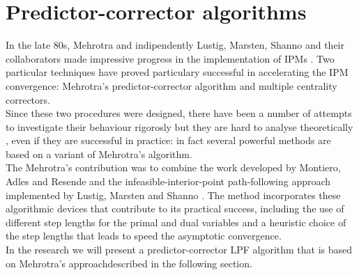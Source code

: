 \documentclass[a4paper,10 pt,titlepage,twoside]{report}
\theoremstyle{plain}
\theoremstyle{definition}
\theoremstyle{remark}
\begin{document}
\section{Predictor-corrector algorithms}\label{sec:pc}
In the late 80s, Mehrotra and indipendently Lustig, Marsten, Shanno and their collaborators made impressive progress in the implementation of IPMs \cite{Mehr}. Two particular techniques have proved particulary successful in accelerating the IPM convergence: Mehrotra's predictor-corrector algorithm and multiple centrality correctors. \\Since these two procedures were designed, there have been a number of attempts to investigate their behaviour rigorosly but they are hard to analyse theoretically \cite{25y}, even if they are successful in practice: in fact several powerful methods are based on a variant of Mehrotra's algorithm.\\
The Mehrotra's contribution was to combine the work developed by Montiero, Adles and Resende \cite{MARE} and the infeasible-interior-point path-following approach implemented by Lustig, Marsten and Shanno \cite{LMS}. 
The method incorporates these algorithmic devices that contribute to its practical success, including the use of different step lengths for the primal and dual variables and a heuristic choice of the step lengths that leads to speed the asymptotic convergence.\\In the research we will present a predictor-corrector LPF algorithm that is based on Mehrotra's approachdescribed in the following section. 
\end{document}

